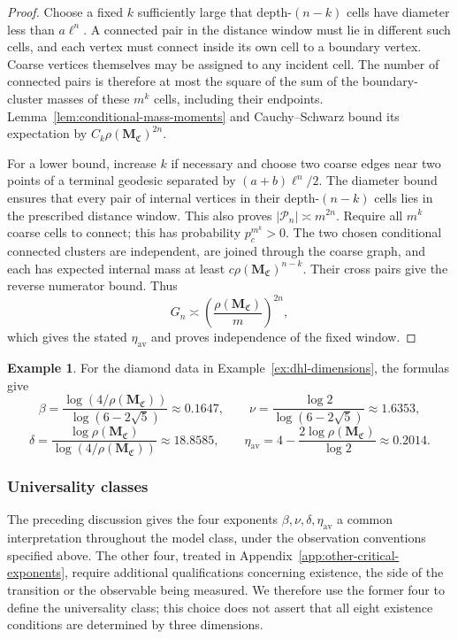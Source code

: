 \documentclass[scheme=plain,11pt]{ctexart}
\theoremstyle{definition}
\newtheorem{example}[theorem]{Example}
\theoremstyle{remark}
\begin{document}
\begin{proof}
Choose a fixed $k$ sufficiently large that depth-$(n-k)$ cells have diameter less than $a\ell^n$.
A connected pair in the distance window must lie in different such cells, and each vertex must connect inside its own cell to a boundary vertex.
Coarse vertices themselves may be assigned to any incident cell.
The number of connected pairs is therefore at most the square of the sum of the boundary-cluster masses of these $m^k$ cells, including their endpoints.
Lemma~\ref{lem:conditional-mass-moments} and Cauchy--Schwarz bound its expectation by $C_k\rho(\mathbf M_{\mathfrak C})^{2n}$.

For a lower bound, increase $k$ if necessary and choose two coarse edges near two points of a terminal geodesic separated by $(a+b)\ell^n/2$.
The diameter bound ensures that every pair of internal vertices in their depth-$(n-k)$ cells lies in the prescribed distance window.
This also proves $|\mathcal P_n|\asymp m^{2n}$.
Require all $m^k$ coarse cells to connect; this has probability $p_c^{m^k}>0$.
The two chosen conditional connected clusters are independent, are joined through the coarse graph, and each has expected internal mass at least $c\rho(\mathbf M_{\mathfrak C})^{n-k}$.
Their cross pairs give the reverse numerator bound.
Thus
\[
 G_n\asymp\left(\frac{\rho(\mathbf M_{\mathfrak C})}{m}\right)^{2n},
\]
which gives the stated $\eta_{\mathrm{av}}$ and proves independence of the fixed window.
\end{proof}

\begin{example}\label{ex:dhl-four-exponents}
For the diamond data in Example~\ref{ex:dhl-dimensions}, the formulas give
\[
 \beta=\frac{\log(4/\rho(\mathbf M_{\mathfrak C}))}{\log(6-2\sqrt5)}\approx0.1647,
 \qquad
 \nu=\frac{\log2}{\log(6-2\sqrt5)}\approx1.6353,
\]
\[
 \delta=\frac{\log\rho(\mathbf M_{\mathfrak C})}{\log(4/\rho(\mathbf M_{\mathfrak C}))}\approx18.8585,
 \qquad
 \eta_{\mathrm{av}}=4-\frac{2\log\rho(\mathbf M_{\mathfrak C})}{\log2}\approx0.2014.
\]
\end{example}

\subsubsection*{Universality classes}
The preceding discussion gives the four exponents $\beta,\nu,\delta,\eta_{\mathrm{av}}$ a common interpretation throughout the model class, under the observation conventions specified above.
The other four, treated in Appendix~\ref{app:other-critical-exponents}, require additional qualifications concerning existence, the side of the transition or the observable being measured.
We therefore use the former four to define the universality class; this choice does not assert that all eight existence conditions are determined by three dimensions.
\end{document}
